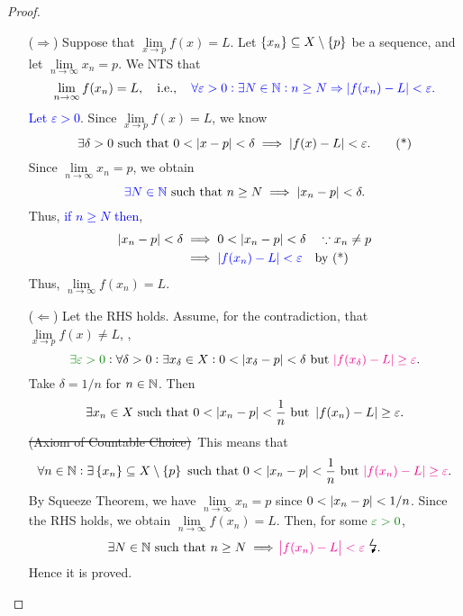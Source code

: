 \documentclass[11pt,openany]{article}
\begin{document}
\begin{proof}
\begin{itemize}
	\item[($\Rightarrow$)] Suppose that $\lim\limits_{x\to p}f(x)=L$. Let $\set{x_n}\subseteq X\setminus\set{p}$ be a sequence, and let $\lim\limits_{n\to\infty}x_n=p$. We NTS that \[
	\lim\limits_{n\to\infty}f(x_n)=L,\quad\textnormal{i.e.},\color{blue}\quad\forall\varepsilon>0:\exists N\in\mathbb{N}:n\geq N\Rightarrow\abs[0]{f(x_n)-L}<\varepsilon.
	\] \textcolor{blue}{Let $\varepsilon>0$}. Since $\lim\limits_{x\to p}f(x)=L$, we know \begin{equation*}
		\exists\delta>0\ \text{such that}\ 0<\abs[0]{x-p}<\delta\implies\abs[0]{f(x)-L}<\varepsilon.\tag{*}
	\end{equation*} Since $\lim\limits_{n\to\infty}x_n=p$, we obtain \[
	\textcolor{blue}{\exists N\in\N}\ \text{such that}\ n\geq N\implies\abs[0]{x_n-p}<\delta.
	\] Thus, \textcolor{blue}{if $n\geq N$ then}, \begin{align*}
		\abs[0]{x_n-p}<\delta&\implies 0<\abs[0]{x_n-p}<\delta\quad\because x_n\neq p \\
		&\implies\textcolor{blue}{\abs[0]{f(x_n)-L}<\varepsilon}\quad\text{by (*)}
	\end{align*} Thus, $\lim\limits_{n\to\infty}f(x_n)=L$.
	\item[($\Leftarrow$)] Let the RHS holds. Assume, for the contradiction, that $\lim\limits_{x\to p} f(x)\neq L$, \ie, \[
	\textcolor{green!50!black}{\exists\varepsilon>0}:\forall\delta>0:\exists x_\delta\in X:0<\abs[0]{x_\delta-p}<\delta\ \text{but}\ \textcolor{magenta}{\abs[0]{f(x_\delta)-L}\geq\varepsilon}.
	\] Take $\delta=1/n$ for $n\in\mathbb{N}$. Then \[
	\exists x_n\in X\ \text{such that}\ 0<\abs[0]{x_n-p}<\frac{1}{n}\ \text{but}\ \abs[0]{f(x_n)-L}\geq \varepsilon.
	\] \textcolor{gray!50}{\st{(Axiom of Countable Choice)}}\ This means that \[
	\forall n\in\N:\exists\set{x_n}\subseteq X\setminus\set{p}\ \text{such that}\ 0<\abs[0]{x_n-p}<\frac{1}{n}\ \text{but}\ \textcolor{magenta}{\abs[0]{f(x_n)-L}\geq \varepsilon}.
	\] By Squeeze Theorem, we have $\lim\limits_{n\to\infty}x_n=p$ since $0<\abs[0]{x_n-p}<1/n$. Since the RHS holds, we obtain $\lim\limits_{n\to\infty}f(x_n)=L$. Then, for some $\textcolor{green!50!black}{\varepsilon>0}$, \[
	\exists N\in\N\ \text{such that}\ n\geq N\implies\textcolor{magenta}{\abs{f(x_n)-L}<\varepsilon}\ \text{\Large\lightning}.
	\] Hence it is proved.
\end{itemize}
\end{proof}
\end{document}
